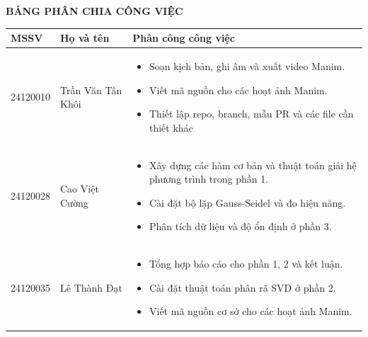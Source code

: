 \newpage

\begin{center}
    \Large\textbf{BẢNG PHÂN CHIA CÔNG VIỆC}
\end{center}

\begin{table}[H]
    \centering
    \renewcommand{\arraystretch}{1.3}
    \setlength{\tabcolsep}{6pt}
    \setlength{\arrayrulewidth}{1pt}

    \begin{tabular}{|p{2cm}|p{4cm}|p{10cm}|}
        \hline
        \rowcolor[rgb]{0.8, 0.9, 1.0}
        \textbf{MSSV} & \textbf{Họ và tên} & \textbf{Phân công công việc} \\ \hline

        24120010 & Trần Văn Tấn Khôi &
        \vspace{-0.5\baselineskip}
        \begin{itemize}[itemsep=0pt, topsep=0pt, partopsep=0pt, parsep=0pt]
            \item Soạn kịch bản, ghi âm và xuất video Manim.
            \item Viết mã nguồn cho các hoạt ảnh Manim.
            \item Thiết lập repo, branch, mẫu PR và các file cần thiết khác
        \end{itemize} \\ \hline

        24120028 & Cao Việt Cường & 
        \vspace{-0.5\baselineskip}
        \begin{itemize}[itemsep=0pt, topsep=0pt, partopsep=0pt, parsep=0pt]
            \item Xây dựng các hàm cơ bản và thuật toán giải hệ phương trình trong phần 1.
            \item Cài đặt bộ lặp Gauss-Seidel và đo hiệu năng.
            \item Phân tích dữ liệu và độ ổn định ở phần 3.
        \end{itemize} \\ \hline

        24120035 & Lê Thành Đạt & 
        \vspace{-0.5\baselineskip}
        \begin{itemize}[itemsep=0pt, topsep=0pt, partopsep=0pt, parsep=0pt]
            \item Tổng hợp báo cáo cho phần 1, 2 và kết luận.
            \item Cài đặt thuật toán phân rã SVD ở phần 2.
            \item Viết mã nguồn cơ sở cho các hoạt ảnh Manim. 
        \end{itemize} \\ \hline


\end{tabular}
\end{table}
